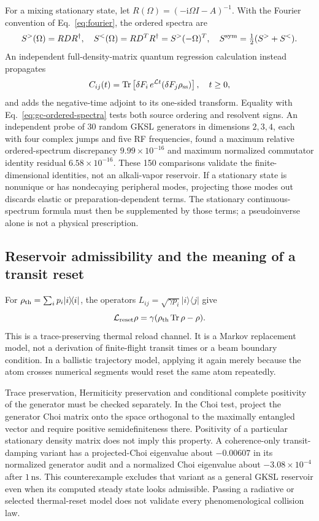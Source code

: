 \documentclass[11pt,a4paper]{article}
\newcommand{\ii}{\mathrm i}
\newcommand{\Tr}{\operatorname{Tr}}
\newcommand{\ketbra}[2]{\lvert #1\rangle\!\langle #2\rvert}
\begin{document}
For a mixing stationary state, let
$R(\Omega)=(-\ii\Omega I-A)^{-1}$. With the Fourier convention of
Eq.~\eqref{eq:fourier}, the ordered spectra are
\begin{equation}
 S^>(\Omega)=RDR^\dagger,\quad
 S^<(\Omega)=RD^TR^\dagger=S^>(-\Omega)^T,\quad
 S^{\rm sym}=\tfrac12(S^>+S^<).
 \label{eq:gc-ordered-spectra}
\end{equation}
An independent full-density-matrix quantum regression calculation instead
propagates
\begin{equation}
 C_{ij}(t)=\Tr\left[\delta F_i\,e^{\mathcal L t}
                 (\delta F_j\rho_{\rm ss})\right],\quad t\geq0,
 \label{eq:gc-qrt}
\end{equation}
and adds the negative-time adjoint to its one-sided transform. Equality with
Eq.~\eqref{eq:gc-ordered-spectra} tests both source ordering and resolvent signs.
An independent probe of 30 random GKSL generators in dimensions $2,3,4$, each
with four complex jumps and five RF frequencies, found a maximum relative
ordered-spectrum discrepancy $9.99\times10^{-16}$ and maximum normalized
commutator identity residual $6.58\times10^{-16}$. These 150 comparisons
validate the finite-dimensional identities, not an alkali-vapor reservoir.
If a stationary state is nonunique or has nondecaying peripheral modes,
projecting those modes out discards elastic or preparation-dependent terms.
The stationary continuous-spectrum formula must then be supplemented by those
terms; a pseudoinverse alone is not a physical prescription.

\subsection{Reservoir admissibility and the meaning of a transit reset}
For $\rho_{\rm th}=\sum_i p_i\ketbra{i}{i}$, the operators
$L_{ij}=\sqrt{\gamma p_i}\ketbra{i}{j}$ give
\begin{equation}
 \mathcal L_{\rm reset}\rho
 =\gamma(\rho_{\rm th}\Tr\rho-\rho).
 \label{eq:gc-reset}
\end{equation}
This is a trace-preserving thermal reload channel. It is a Markov replacement
model, not a derivation of finite-flight transit times or a beam boundary
condition. In a ballistic trajectory model, applying it again merely because
the atom crosses numerical segments would reset the same atom repeatedly.

Trace preservation, Hermiticity preservation and conditional complete
positivity of the generator must be checked separately. In the Choi test,
project the generator Choi matrix onto the space orthogonal to the maximally
entangled vector and require positive semidefiniteness there. Positivity of a
particular stationary density matrix does not imply this property. A
coherence-only transit-damping variant has a projected-Choi eigenvalue about
$-0.00607$ in its normalized generator audit and a normalized Choi eigenvalue
about $-3.08\times10^{-4}$ after $1\,\mathrm{ns}$. This counterexample excludes
that variant as a general GKSL reservoir even when its computed steady state
looks admissible. Passing a radiative or selected thermal-reset model does not
validate every phenomenological collision law.
\end{document}
